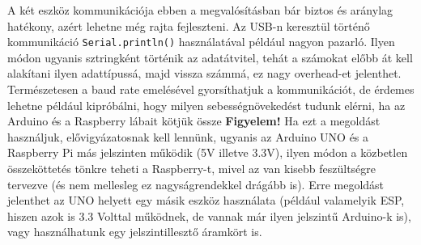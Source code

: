 \documentclass[12pt,a4paper]{article}
\begin{document}
      A két eszköz kommunikációja ebben a megvalósításban bár biztos és aránylag hatékony, azért lehetne még rajta fejleszteni. Az USB-n keresztül történő kommunikáció \texttt{Serial.println()} használatával például nagyon pazarló. Ilyen módon ugyanis sztringként történik az adatátvitel, tehát a számokat előbb át kell alakítani ilyen adattípussá, majd vissza számmá, ez nagy overhead-et jelenthet. Természetesen a baud rate emelésével gyorsíthatjuk a kommunikációt, de érdemes lehetne például kipróbálni, hogy milyen sebességnövekedést tudunk elérni, ha az Arduino és a Raspberry lábait kötjük össze \textbf{Figyelem!} Ha ezt a megoldást használjuk, elővigyázatosnak kell lennünk, ugyanis az Arduino UNO és a Raspberry Pi más jelszinten működik (5V illetve 3.3V), ilyen módon a közbetlen összeköttetés tönkre teheti a Raspberry-t, mivel az van kisebb feszültségre tervezve (és nem mellesleg ez nagyságrendekkel drágább is). Erre megoldást jelenthet az UNO helyett egy másik eszköz használata (például valamelyik ESP, hiszen azok is 3.3 Volttal működnek, de vannak már ilyen jelszintű Arduino-k is), vagy használhatunk egy jelszintillesztő áramkört is.
\end{document}
